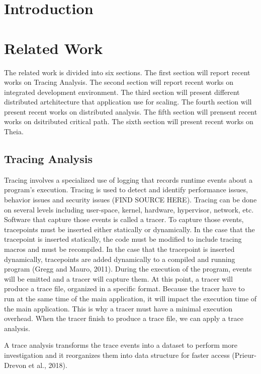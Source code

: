 \label{sec:architecture}

\section{Introduction}

\section{Related Work}

The related work is divided into six sections. The ﬁrst section will report recent works on Tracing Analysis. The second section will report recent works on integrated development environment. The third section will present different distributed artchitecture that application use for scaling. The fourth section will present recent works on distributed analysis. The fifth section will prensent recent works on dsitributed critical path. The sixth section will present recent works on Theia.


\subsection{Tracing Analysis}

 Tracing involves a specialized use of logging that records runtime events about a program's execution. 
 Tracing is used to detect and identify performance issues, behavior issues and security issues (FIND SOURCE HERE). Tracing can be done on several levels including user-space, kernel, hardware, hypervisor, network, etc. Software that capture those events is called a tracer. To capture those events, tracepoints must be inserted either statically or dynamically. In the case that the tracepoint is inserted statically, the code must be modified to include tracing macros and must be recompiled. In the case that the tracepoint is inserted dynamically, tracepoints are added dynamically to a compiled and running program (Gregg and Mauro, 2011). During the execution of the program, events will be emitted and a tracer will capture them. At this point, a tracer will produce a trace file, organized in a specific format. Because the tracer have to run at the same time of the main application, it will impact the execution time of the main application. This is why a tracer must have a minimal execution overhead. When the tracer finish to produce a trace file, we can apply a trace analysis.

 A trace analysis transforms the trace events into a dataset to perform more investigation and it reorganizes them into data structure for faster access (Prieur-Drevon et al., 2018).

